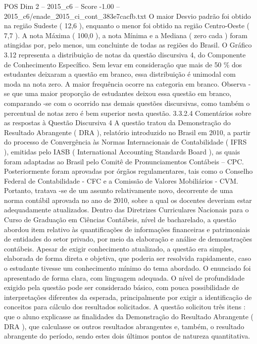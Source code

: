 \begin{textsample}{POS Dim 2 – 2015\_c6 – Score -1.00 – 2015\_c6/enade\_2015\_ci\_cont\_383e7cacfb.txt}
O maior Desvio padrão foi obtido na região Sudeste ( 12,6 ), enquanto o menor foi obtido na região Centro-Oeste ( 7,7 ).
A nota Máxima ( 100,0 ), a nota Mínima e a Mediana ( zero cada ) foram atingidas por, pelo menos, um concluinte de todas as regiões do Brasil.
O Gráfico 3.12 representa a distribuição de notas da questão discursiva 4, do Componente de Conhecimento Específico.
Sem levar em consideração que mais de 50 \% dos estudantes deixaram a questão em branco, essa distribuição é unimodal com moda na nota zero.
A maior frequência ocorre na categoria em branco.
Observa -se que uma maior proporção de estudantes deixou essa questão em branco, comparando -se com o ocorrido nas demais questões discursivas, como também o percentual de notas zero é bem superior nesta questão. 3.3.2.4 Comentários sobre as respostas à Questão Discursiva 4 A questão tratou da Demonstração do Resultado Abrangente ( DRA ), relatório introduzido no Brasil em 2010, a partir do processo de Convergência às Normas Internacionais de Contabilidade ( IFRS ), emitidas pelo IASB ( International Accounting Standards Board ), as quais foram adaptadas ao Brasil pelo Comitê de Pronunciamentos Contábeis – CPC.
Posteriormente foram aprovadas por órgãos regulamentares, tais como o Conselho Federal de Contabilidade - CFC e a Comissão de Valores Mobiliários - CVM.
Portanto, tratava -se de um assunto relativamente novo, decorrente de uma norma contábil aprovada no ano de 2010, sobre a qual os docentes deveriam estar adequadamente atualizados.
Dentro das Diretrizes Curriculares Nacionais para o Curso de Graduação em Ciências Contábeis, nível de bacharelado, a questão abordou item relativo às quantificações de informações financeiras e patrimoniais de entidades do setor privado, por meio da elaboração e análise de demonstrações contábeis.
Apesar de exigir conhecimento atualizado, a questão era simples, elaborada de forma direta e objetiva, que poderia ser resolvida rapidamente, caso o estudante tivesse um conhecimento mínimo do tema abordado.
O enunciado foi apresentado de forma clara, com linguagem adequada.
O nível de profundidade exigido pela questão pode ser considerado básico, com pouca possibilidade de interpretações diferentes da esperada, principalmente por exigir a identificação de conceitos para cálculo dos resultados solicitados.
A questão solicitou três itens : que o aluno explicasse as finalidades da Demonstração do Resultado Abrangente ( DRA ), que calculasse os outros resultados abrangentes e, também, o resultado abrangente do período, sendo estes dois últimos pontos de natureza quantitativa.

\end{textsample}
